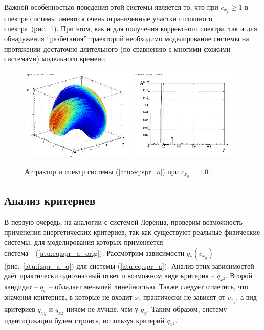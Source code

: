 Важной особенностью поведения этой системы является то, что при $ c_{x_y} \ge 1 $
в спектре системы имеются очень ограниченные участки сплошного спектра~(рис.~\ref{atu:f:spr_a_p_1000}).
При этом, как и для получения корректного спектра, так и для обнаружения ``разбегания'' траекторий
необходимо моделирование системы на протяжении достаточно длительного
(по сравнению с многими схожими системами) модельного времени.

\begin{figure}[htb!]
\centerline{
  \includegraphics[width=0.49\textwidth]{p/cha/spr_a/sprott_a-p_xyz_cx_y=1x000.png}
  \includegraphics[width=0.49\textwidth]{p/cha/spr_a/sprott_a_f-p_f_cx_y=1x000.png}
}
\caption{Аттрактор и спектр системы (\ref{atu:eq:spr_a}) при $ c_{x_y} =1.0 $.
}
\label{atu:f:spr_a_p_1000}
\end{figure}



\subsection{Анализ критериев}  %

В первую очередь, на аналогии с системой Лоренца,
проверим возможность применения энергетических критериев,
так как существуют реальные физические системы,
для моделирования которых применяется система~~(\ref{atu:eq:spr_a_orig}).
Рассмотрим зависимости $q_{*}(c_{x_y}) $ (рис.~\ref{atu:f:spr_a_q})
для системы (\ref{atu:eq:spr_a}). Анализ этих зависимостей
даёт практически однозначный ответ о возможном виде критерия -- $q_{x^2}$.
Второй кандидат -- $q_{x}$ -- обладает меньшей линейностью.
Также следует отметить, что
значения критериев, в которые не входит $x$, практически не зависят от $c_{x_y}$,
а вид критериев $q_{xy}$ и $q_{xz}$ ничем не лучше, чем у $q_{x}$.
Таким образом, систему идентификации будем строить, используя критерий  $q_{x^2}$.

